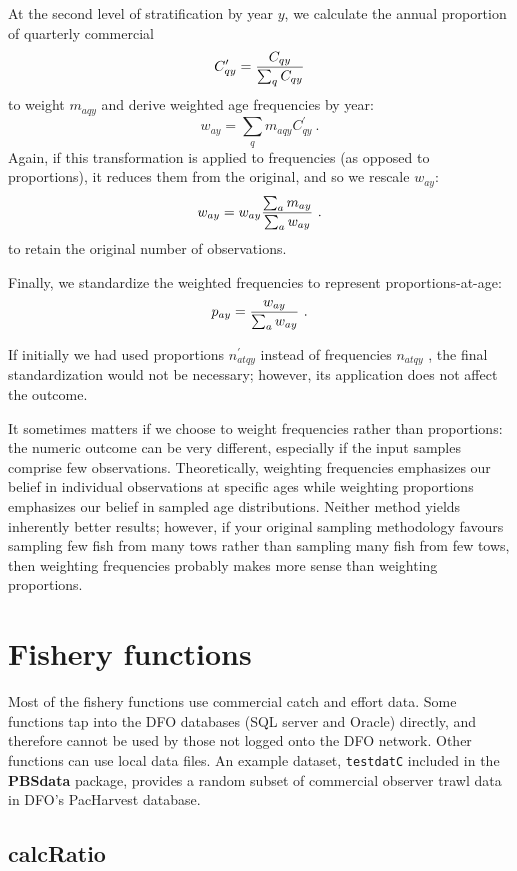 \documentclass[letterpaper,12pt,fleqn]{article}
\def\tab{\hspace{0.5 in}}
\newcommand{\code}[1]{\small\texttt{#1}\normalsize}
\newcommand{\pkg}[1]{{\bf #1}}
\newcommand{\eqn}[1]{\begin{equation}#1\end{equation}}
\newcommand{\gfrac}[2]{\genfrac{}{}{}{0}{#1}{#2}}
\newcommand{\db}[1]{\small\textmd{\textsf{#1}}\normalsize}
\begin{document}
\tab At the second level of stratification by year $y$, we calculate the annual proportion of quarterly commercial
%
\eqn{C_{qy}^\prime = \gfrac{C_{qy}}{\sum_{q} C_{qy}}}
%
to weight $m_{aqy}$ and derive weighted age frequencies by year:
%
\eqn{w_{ay} = \sum_{q} m_{aqy} C_{qy}^\prime~.}
%
Again, if this transformation is applied to frequencies (as opposed to proportions), it reduces them from the original, and so we rescale $w_{ay}$:
%
\eqn{w_{ay} = w_{ay} \gfrac{\sum_{a} m_{ay}}{\sum_{a} w_{ay}}~.}
%
to retain the original number of observations.

\tab Finally, we standardize the weighted frequencies to represent proportions-at-age:
%
\eqn{p_{ay} = \gfrac{w_{ay}}{\sum_{a} w_{ay}}~.}
%

If initially we had used proportions $n_{atqy}^\prime$ instead of frequencies $n_{atqy}$ , the final standardization would not be necessary; however, its application does not affect the outcome.

\tab It sometimes matters if we choose to weight frequencies rather than proportions: the numeric outcome can be very different, especially if the input samples comprise few observations. Theoretically, weighting frequencies emphasizes our belief in individual observations at specific ages while weighting proportions emphasizes our belief in sampled age distributions. Neither method yields inherently better results; however, if your original sampling methodology favours sampling few fish from many tows rather than sampling many fish from few tows, then weighting frequencies probably makes more sense than weighting proportions.
\clearpage

\section {Fishery functions}

\tab Most of the fishery functions use commercial catch and effort data. Some functions tap into the DFO databases (SQL server and Oracle) directly, and therefore cannot be used by those not logged onto the DFO network. Other functions can use local data files. An example dataset, \code{testdatC} included in the \pkg{PBSdata} package, provides a random subset of commercial observer trawl data in DFO's \db{PacHarvest} database.

\subsection {calcRatio}
\end{document}
